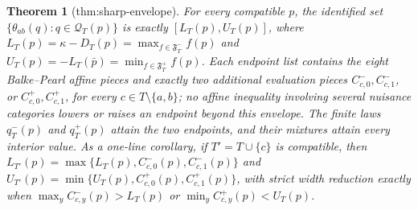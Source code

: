 \documentclass{article}
\newtheorem{theorem}{Theorem}
\begin{document}
\begin{theorem}[thm:sharp-envelope]\label{thm:sharp-envelope}
For every compatible \(p\), the identified set \(\{\theta_{ab}(q):q\in\mathcal Q_T(p)\}\) is exactly \([L_T(p),U_T(p)]\), where \(L_T(p)=\kappa-D_T(p)=\max_{f\in\mathfrak F^-_T}f(p)\) and \(U_T(p)=-L_T(\bar p)=\min_{f\in\mathfrak F^+_T}f(p)\). Each endpoint list contains the eight Balke--Pearl affine pieces and exactly two additional evaluation pieces \(C^-_{c,0},C^-_{c,1}\), or \(C^+_{c,0},C^+_{c,1}\), for every \(c\in T\setminus\{a,b\}\); no affine inequality involving several nuisance categories lowers or raises an endpoint beyond this envelope. The finite laws \(q^-_T(p)\) and \(q^+_T(p)\) attain the two endpoints, and their mixtures attain every interior value. As a one-line corollary, if \(T'=T\cup\{c\}\) is compatible, then \(L_{T'}(p)=\max\{L_T(p),C^-_{c,0}(p),C^-_{c,1}(p)\}\) and \(U_{T'}(p)=\min\{U_T(p),C^+_{c,0}(p),C^+_{c,1}(p)\}\), with strict width reduction exactly when \(\max_yC^-_{c,y}(p)>L_T(p)\) or \(\min_yC^+_{c,y}(p)<U_T(p)\).
\end{theorem}
\end{document}
